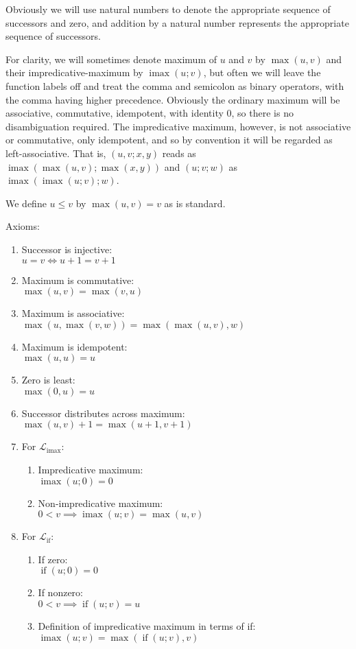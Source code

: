 \documentclass[11pt, twoside, reqno]{book}
\DeclareMathOperator{\imax}{imax}
\DeclareMathOperator{\ifop}{if}
\begin{document}
Obviously we will use natural numbers to denote the appropriate sequence of successors and zero, and addition by a natural number represents the appropriate sequence of successors.

For clarity, we will sometimes denote maximum of $u$ and $v$ by $\max(u, v)$ and their impredicative-maximum by $\imax(u; v)$, but often we will leave the function labels off and treat the comma and semicolon as binary operators, with the comma having higher precedence.
Obviously the ordinary maximum will be associative, commutative, idempotent, with identity $0$, so there is no disambiguation required.
The impredicative maximum, however, is not associative or commutative, only idempotent, and so by convention it will be regarded as left-associative.
That is, $(u, v; x, y)$ reads as $\imax(\max(u, v); \max(x, y))$ and $(u; v; w)$ as $\imax(\imax(u; v); w)$.

We define $u \le v$ by $\max(u, v) = v$ as is standard.

Axioms:
\label{alg-uni-laws}
\begin{enumerate}
\item Successor is injective:\\
  $u = v \iff u+1 = v+1$
\item Maximum is commutative:\\
  $\max(u, v) = \max(v, u)$
\item Maximum is associative:\\
  $\max(u, \max(v, w)) = \max(\max(u, v), w)$
\item Maximum is idempotent:\\
  $\max(u, u) = u$
\item Zero is least:\\
  $\max(0, u) = u$
\item Successor distributes across maximum:\\
  $\max(u, v) + 1 = \max(u + 1, v + 1)$
\item For $\mathcal{L}_{\imax}$:
\begin{enumerate}
\item Impredicative maximum:\\
  $\imax(u; 0) = 0$
\item Non-impredicative maximum:\\
  $0 < v \implies \imax(u; v) = \max(u, v)$
\end{enumerate}
\item For $\mathcal{L}_{\ifop}$:
\begin{enumerate}
\item If zero:\\
  $\ifop(u; 0) = 0$
\item If nonzero:\\
  $0 < v \implies \ifop(u; v) = u$
\item Definition of impredicative maximum in terms of if:\\
  $\imax(u; v) = \max(\ifop(u; v), v)$
\end{enumerate}
\end{enumerate}
\end{document}
